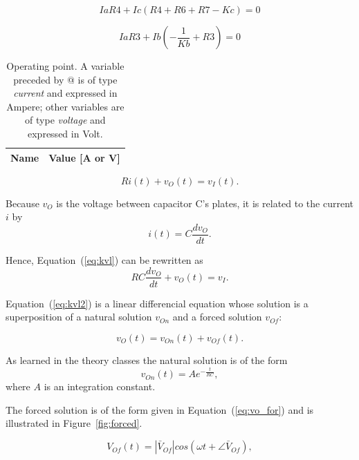 \begin{equation}
  IaR4 + Ic(R4+R6+R7-Kc) = 0
\end{equation}

\begin{equation}
  IaR3 + Ib(-\frac{1}{Kb}+R3) = 0
\end{equation}

\begin{table}[h]
  \centering
  \begin{tabular}{|l|r|}
    \hline    
    {\bf Name} & {\bf Value [A or V]} \\ \hline
    
  \end{tabular}
  \caption{Operating point. A variable preceded by @ is of type {\em current}
    and expressed in Ampere; other variables are of type {\it voltage} and expressed in
    Volt.}
  \label{tab:nos}
\end{table}


\begin{equation}
  Ri(t) + v_O(t) = v_I(t).
  \label{eq:kvl}
\end{equation}

Because $v_O$ is the voltage between capacitor C's plates, it is related to the
current $i$ by
\begin{equation}
  i(t) = C\frac{dv_O}{dt}.
\end{equation}

Hence, Equation~(\ref{eq:kvl}) can be rewritten as
\begin{equation}
  RC\frac{dv_O}{dt} + v_O(t) = v_I.
  \label{eq:kvl2}
\end{equation}

Equation~(\ref{eq:kvl2}) is a linear differencial equation whose solution is a
superposition of a natural solution $v_{On}$ and a forced solution $v_{Of}$:

\begin{equation}
  v_O(t) = v_{On}(t) + v_{Of}(t).
  \label{eq:vo_sol}
\end{equation}

As learned in the theory classes the natural solution is of the form
\begin{equation}
  v_{On}(t) = Ae^{-\frac{t}{RC}},
  \label{eq:vo_nat}
\end{equation}
where $A$ is an integration constant.

The forced solution is of the form given in Equation~(\ref{eq:vo_for}) and is
illustrated in Figure~\ref{fig:forced}.

\begin{equation}
  V_{Of}(t) = |\bar{V}_{Of}| cos(\omega t + \angle \bar{V}_{Of}),
  \label{eq:vo_for}
\end{equation}

